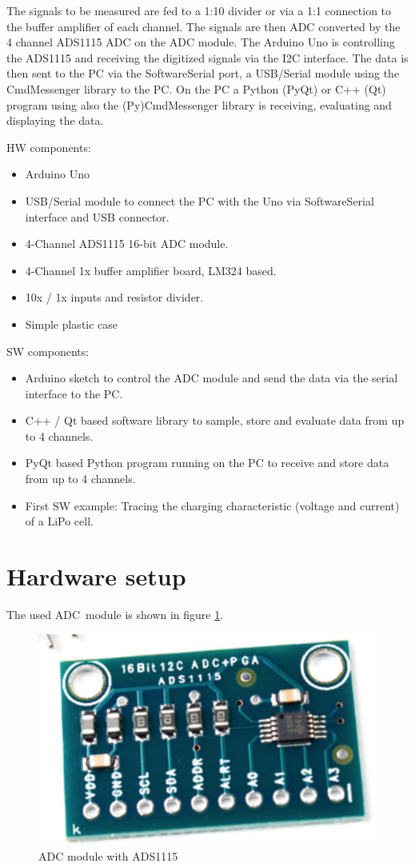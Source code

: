 \documentclass[11pt, oneside]{scrartcl}   	%
\begin{document}
The signals to be measured are fed to a 1:10 divider or via a 1:1 connection to the buffer amplifier of each channel.
The signals are then ADC converted by the 4 channel ADS1115 ADC on the ADC module.
The Arduino Uno is controlling the ADS1115 and receiving the digitized signals via the I2C interface.
The data is then sent to the PC via the SoftwareSerial port, a USB/Serial module using the CmdMessenger library to the PC.
On the PC a Python (PyQt) or C++ (Qt) program using also the (Py)CmdMessenger library is receiving, evaluating and displaying the data.

HW components:
\begin{itemize}
	\item Arduino Uno
	\item USB/Serial module to connect the PC with the Uno via SoftwareSerial interface and USB connector.
	\item 4-Channel ADS1115 16-bit ADC module.
	\item 4-Channel 1x buffer amplifier board, LM324 based.
	\item 10x / 1x inputs and resistor divider.
	\item Simple plastic case
\end{itemize}

SW components:
\begin{itemize}
	\item Arduino sketch to control the ADC module and send the data via the serial interface to the PC.
	\item C++ / Qt based software library to sample, store and evaluate data from up to 4 channels.
	\item PyQt based Python program running on the PC to receive and store data from up to 4 channels.
	\item First SW example: Tracing the charging characteristic (voltage and current) of a LiPo cell.
\end{itemize}

\section{Hardware setup}
The used ADC module is shown in figure \ref{fig:HWSetup}.
\begin{figure}[htbp]
	\centering
	\includegraphics[width=1.0\linewidth]{Figures/ADS1115ADCBoard.png}
	\caption{ADC module with ADS1115}
	\label{fig:HWSetup}
\end{figure}
\end{document}
